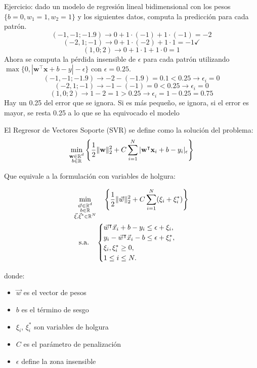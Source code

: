 Ejercicio: dado un modelo de regresión lineal bidimensional con los pesos $\{b = 0, w_1 = 1, w_2 = 1\}$ y los siguientes datos, computa la predicción para cada patrón.
$$(-1, -1; -1.9) \rightarrow 0 + 1 \cdot (-1) + 1 \cdot (-1) = -2$$
$$(-2, 1; -1) \rightarrow 0 + 1 \cdot (-2) + 1 \cdot 1 = -1 \checkmark$$
$$(1, 0; 2) \rightarrow 0 + 1 \cdot 1 + 1 \cdot 0 = 1$$
Ahora se computa la pérdida insensible de $\epsilon$ para cada patrón utilizando $\max\bigl\{0, |\mathbf{w}^\intercal \mathbf{x} + b - y| - \epsilon\bigr\}$ con $\epsilon = 0.25$.
$$(-1, -1; -1.9) \rightarrow -2 -(-1.9) = 0.1 < 0.25 \rightarrow \epsilon_i = 0$$
$$(-2, 1; -1) \rightarrow -1 - (-1) = 0 < 0.25 \rightarrow \epsilon_i = 0 $$
$$(1, 0; 2) \rightarrow 1 - 2 = 1 > 0.25 \rightarrow \epsilon_i = 1 - 0.25 = 0.75$$
Hay un 0.25 del error que se ignora. Si es más pequeño, se ignora, si el error es mayor, se resta 0.25 a lo que se ha equivocado el modelo 

El Regresor de Vectores Soporte (SVR) se define como la solución del problema:
$$\min_{\begin{subarray}{c}
    \mathbf{w} \in \mathbb{R}^d \\
    b \in \mathbb{R}
\end{subarray}}
\left\{
    \frac{1}{2} \|\mathbf{w}\|_2^2 + C \sum_{i=1}^{N} |\mathbf{w}^{\intercal} \mathbf{x}_i + b - y_i|_\epsilon
\right\}$$

Que equivale a la formulación con variables de holgura:

\begin{align*}
\min_{\begin{subarray}{c}
    \vec{w} \in \mathbb{R}^d \\
    b \in \mathbb{R} \\
    \vec{\xi}, \vec{\xi}^* \in \mathbb{R}^N
\end{subarray}}
&\quad \left\{
    \frac{1}{2} \|\vec{w}\|_2^2 + C \sum_{i=1}^{N} (\xi_i + \xi_i^*)
\right\} \\
\text{s.a.} \quad &
\begin{cases}
    \vec{w}^{\intercal} \vec{x}_i + b - y_i \leq \epsilon + \xi_i, \\
    y_i - \vec{w}^{\intercal} \vec{x}_i - b \leq \epsilon + \xi_i^*, \\
    \xi_i, \xi_i^* \geq 0, \\
    1 \leq i \leq N.
\end{cases}
\end{align*}

donde:
\begin{itemize}
    \item $\vec{w}$ es el vector de pesos
    \item $b$ es el término de sesgo
    \item $\xi_i$, $\xi_i^*$ son variables de holgura
    \item $C$ es el parámetro de penalización
    \item $\epsilon$ define la zona insensible
\end{itemize}

